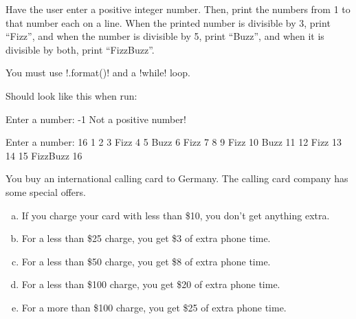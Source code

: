 \documentclass[11pt]{cselabheader}
\begin{document}
{\begin{ex}[fizzbuzz.py] Have the user enter a positive integer number. Then,
  print the numbers from 1 to that number each on a line. When the printed
  number is divisible by 3, print ``Fizz'', and when the number is divisible by
  5, print ``Buzz'', and when it is divisible by both, print ``FizzBuzz''.

  You must use \pythoninline!.format()! and a \pythoninline!while! loop.

  Should look like this when run:

  \begin{verbatimcode}
Enter a number: -1
Not a positive number!
  \end{verbatimcode}

  \begin{verbatimcode}
Enter a number: 16
1
2
3 Fizz
4
5 Buzz
6 Fizz
7
8
9 Fizz
10 Buzz
11
12 Fizz
13
14
15 FizzBuzz
16
  \end{verbatimcode}
\end{ex}



%
%
%

\begin{ex}[calls.py] You buy an international calling card to Germany. The
  calling card company has some special offers.

    \begin{enumerate}[(a)]
      \item If you charge your card with less than \$10, you don't get anything
        extra.
      \item For a less than \$25 charge, you get \$3 of extra phone time.
      \item For a less than \$50 charge, you get \$8 of extra phone time.
      \item For a less than \$100 charge, you get \$20 of extra phone time.
      \item For a more than \$100 charge, you get \$25 of extra phone time.
    \end{enumerate}


\end{ex}}
\end{document}
